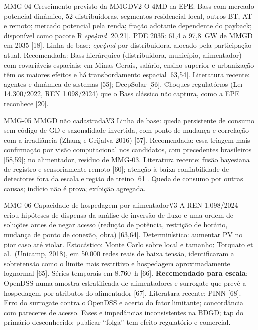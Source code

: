 \begin{ficha}{MMG-04 \textperiodcentered{} Crescimento previsto da MMGD}{V2}
 O 4MD da EPE: Bass com mercado potencial
dinâmico, 52 distribuidoras, segmentos residencial local, outros BT, AT e
remoto; mercado potencial pela renda; fração adotante dependente do payback;
disponível como pacote R \emph{epe4md} [20,21]. PDE 2035: 61,4 a 97,8~GW de
MMGD em 2035 [18].
 Linha de base: \emph{epe4md} por distribuidora, alocado
pela participação atual. Recomendada: Bass hierárquico (distribuidora,
município, alimentador) com covariáveis espaciais; em Minas Gerais, salário,
ensino superior e urbanização têm os maiores efeitos e há transbordamento espacial [53,54].
Literatura recente: agentes e dinâmica de sistemas [55]; DeepSolar [56].
 Choques regulatórios (Lei 14.300/2022, REN 1.098/2024) que
o Bass clássico não captura, como a EPE reconhece [20].
\end{ficha}

\begin{ficha}{MMG-05 \textperiodcentered{} MMGD não cadastrada}{V3}
 Linha de base: queda persistente de consumo sem código de
GD e sazonalidade invertida, com ponto de mudança e correlação com a
irradiância (Zhang e Grijalva 2016) [57]. Recomendada: essa triagem mais
confirmação por visão computacional nos candidatos, com precedentes
brasileiros [58,59]; no alimentador, resíduo de MMG-03. Literatura recente: fusão
bayesiana de registro e sensoriamento remoto [60]; atenção à baixa
confiabilidade de detectores fora da escala e região de treino [61].
 Queda de consumo por outras causas; indício não é prova;
exibição agregada.
\end{ficha}

\begin{ficha}{MMG-06 \textperiodcentered{} Capacidade de hospedagem por alimentador}{V3}
 A REN 1.098/2024 criou hipóteses de dispensa da análise de
inversão de fluxo e uma ordem de soluções antes de negar acesso (redução de
potência, restrição de horário, mudança de ponto de conexão, obra) [63,64].
 Determinístico: aumentar PV no pior caso até violar.
Estocástico: Monte Carlo sobre local e tamanho; Torquato et al.\ (Unicamp,
2018), em 50.000 redes reais de baixa tensão, identificaram a sobretensão como
o limite mais restritivo e hospedagem aproximadamente lognormal [65]. Séries
temporais em 8.760~h [66]. \textbf{Recomendado para escala}: OpenDSS numa
amostra estratificada de alimentadores e surrogate que prevê a hospedagem por
atributos do alimentador [67]. Literatura recente: PINN [68].
 Erro do surrogate contra o OpenDSS e acerto do fator
limitante; concordância com pareceres de acesso.
 Fases e impedâncias inconsistentes na BDGD; tap do
primário desconhecido; publicar ``folga'' tem efeito regulatório e comercial.
\end{ficha}

